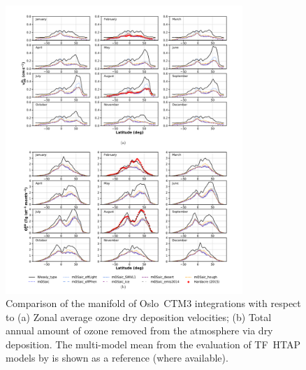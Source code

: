\documentclass[gmd, manuscript]{copernicus}
\providecommand{\DIFaddbeginFL}{} %
\providecommand{\DIFaddendFL}{} %
\providecommand{\DIFdelbeginFL}{} %
\providecommand{\DIFdelendFL}{} %
\begin{document}
\appendixfigures
\begin{figure}[!htbp]
  \DIFdelbeginFL %
\DIFdelendFL \DIFaddbeginFL \includegraphics[width=0.8\textwidth]{fig10}
  \DIFaddendFL \caption{Comparison of the manifold of Oslo~CTM3 integrations with respect to (a) Zonal average ozone dry deposition velocities; (b) Total annual amount of ozone removed from the atmosphere via dry deposition. The multi-model mean from the evaluation of TF~HTAP models by \citet{ACP:Hardacre2015} is shown as a reference (where available).}
  \label{fig:mmm_drydep_season}
\end{figure}
\end{document}
